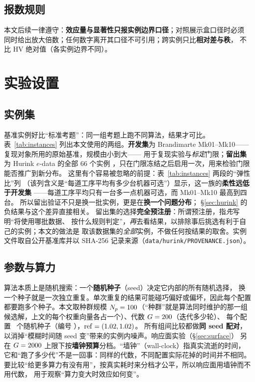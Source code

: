 \documentclass[UTF8, a4paper, 11pt]{ctexart}
\begin{document}
\subsection{报数规则}
本文后续一律遵守：\textbf{效应量与显著性只报实例边界口径}；对照展示盒口径时必须
同时给出放大倍数；任何数字离开其口径不可引用；跨实例只比\textbf{相对差与秩}，
不比 HV 绝对值（各实例边界不同）。

\section{实验设置}\label{sec:setup}

\subsection{实例集}
基准实例好比“标准考题”：同一组考题上跑不同算法，结果才可比。
表~\ref{tab:instances} 列出本文使用的两组。\textbf{开发集}为 Brandimarte
Mk01--Mk10\cite{brandimarte1993}——复现对象所用的原始基准，规模由小到大——
用于复现实验与\emph{标定}门限；\textbf{留出集}为 Hurink $e$-data 的全部 66 个实例
\cite{hurink1994}，只在门限冻结之后启用一次，用来检验门限能否推广到新分布。
这里有个容易被忽略的前提：表~\ref{tab:instances} 两段的“弹性比”列
（该列含义是“每道工序平均有多少台机器可选”）显示，这一族的\textbf{柔性远低于开发集}
——每道工序平均只有一台多一点机器可选，而 Mk01--Mk10 最高到四台。
所以留出验证不只是换一批实例，更是在\textbf{换一个问题分布}；
\S\ref{sec:hurink} 的负结果与这个差异直接相关。
留出集的选择\textbf{完全预注册}：所谓预注册，指\emph{先}写明“将使用哪批数据、
按什么规则判定”，\emph{再}去看结果，以排除事后挑选有利于自己的实例；本文的做法是
取该数据集的\emph{全部}实例，不做任何按结果的取舍。实例文件取自公开基准库并以
SHA-256 记录来源（\texttt{data/hurink/PROVENANCE.json}）。



\subsection{参数与算力}
算法本质上是随机搜索：一个\textbf{随机种子}（seed）决定它内部的所有随机选择，
换一个种子就是一次独立重复。单次重复的结果可能碰巧偏好或偏坏，因此每个配置
都要跑多个种子。本文取种群规模 $N_p=100$（“种群”就是算法同时维护的那一组
候选解，上文的每个权重向量各占一个）、代数 $G=200$（迭代多少轮）、
每个配置 \SetSeeds\ 个随机种子（编号 \SeedRange），$\mathrm{ref}=(1.02,1.02)$。
所有组间比较都做\textbf{同 seed 配对}，
以消掉“模糊时间随 seed 变”带来的实例内噪声。响应面实验（\S\ref{sec:surface}）
另在 $G=2000$ 上限下按\textbf{墙钟预算}分档。“墙钟”（wall-clock）指真实流逝的时间，
它和“跑了多少代”不是一回事：同样的代数，不同配置实际花掉的时间并不相同。
要比较“给更多算力有没有用”，按真实耗时来分档才公平，所以响应面用墙钟而不用代数，
用于观察“算力变大时效应如何变”。
\end{document}
